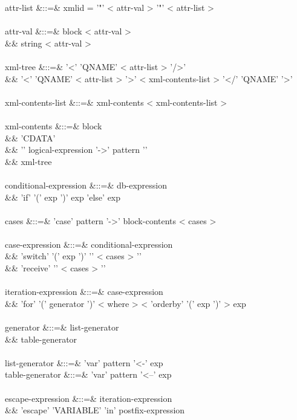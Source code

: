 \documentclass[11pt,a4paper]{article}
\begin{document}
\begin{grammar}
attr-list &::=& xmlid = '"' < attr-val > '"' < attr-list >  \\
\\
attr-val &::=& block < attr-val > \\
&&             string < attr-val >  \\
\\
xml-tree &::=& '<' 'QNAME' < attr-list > '/>' \\
&&             '<' 'QNAME' < attr-list > '>' < xml-contents-list > '</' 'QNAME' '>' \\
\\
xml-contents-list &::=& xml-contents < xml-contents-list > \\
\\
xml-contents &::=& block \\
&&                 'CDATA' \\
&&                 '{' logical-expression '->' pattern '}' \\
&&                 xml-tree \\
\\
conditional-expression &::=& db-expression \\
&&                           'if' '(' exp ')' exp 'else' exp \\
\\
cases &::=& 'case' pattern '->' block-contents < cases >  \\
\\
case-expression &::=&  conditional-expression \\
&&                     'switch' '(' exp ')' '{' < cases > '}' \\
&&                     'receive' '{' < cases > '}' \\
\\
iteration-expression &::=& case-expression \\
&&                         'for' '(' generator ')' < where > < 'orderby' '(' exp ')' > exp \\
\\
generator &::=&  list-generator \\
&&               table-generator \\
\\
list-generator  &::=& 'var' pattern '<-' exp \\
table-generator &::=& 'var' pattern '<--' exp \\
\\
escape-expression &::=& iteration-expression \\
&&                      'escape' 'VARIABLE' 'in' postfix-expression \\

\end{grammar}
\end{document}
